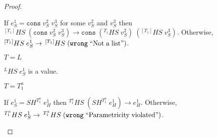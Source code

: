 \begin{theorem}
\begin{proof}
\begin{case}
\begin{case}
If $e_{S}^{1}=\mathtt{cons}\;v_{S}^{2}\;v_{S}^{3}$ for some $v_{S}^{2}$ and $v_{S}^{3}$ then $^{[T_{1}]}HS\;(\mathtt{cons}\;v_{S}^{2}\;v_{S}^{3})\rightarrow\mathtt{cons}\;(^{T_{1}}HS\;v_{S}^{2})\;(^{[T_{1}]}HS\;v_{S}^{3})$.  Otherwise, $^{[T_{1}]}HS\;e_{S}^{1}\rightarrow\,^{[T_{1}]}HS\;(\mathtt{wrong}\;\mathrm{``Not\;a\;list"})$.
\end{case}
\begin{case}
$T=L$

$^{L}HS\;e_{S}^{1}$ is a value.
\end{case}
\begin{case}
$T=T_{1}^{a}$

If $e_{S}^{1}=SH^{T_{1}^{a}}\;e_{H}^{1}$ then $^{T_{1}^{a}}HS\;(SH^{T_{1}^{a}}\;e_{H}^{1})\rightarrow e_{H}^{1}$.  Otherwise, $^{T_{1}^{a}}HS\;e_{S}^{1}\rightarrow\,^{T_{1}^{a}}HS\;(\mathtt{wrong}\;\mathrm{``Parametricity\;violated"})$.
\end{case}
\end{case}
\end{proof}
\end{theorem}